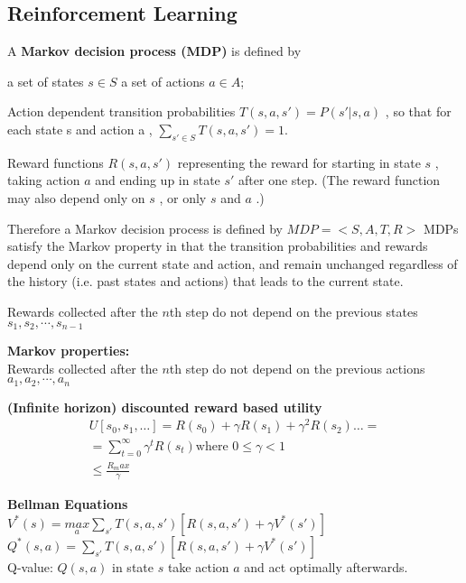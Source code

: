 \subsection{Reinforcement Learning}

A \textbf{Markov decision process (MDP)} is defined by

a set of states  $s\in S$ a set of actions $a \in A$;

Action dependent transition probabilities $T(s,a,s')=P(s'|s, a)$ , so that for each state  s  and action  a ,  $\displaystyle \sum _{s'\in S} T(s,a,s')=1$.

Reward functions $R(s, a, s')$ representing the reward for starting in state  $s$ , taking action  $a$  and ending up in state  $s'$  after one step. (The reward function may also depend only on  $s$ , or only  $s$  and  $a$ .)

Therefore a Markov decision process is defined by $MDP = <S,A,T,R>$ MDPs satisfy the Markov property in that the transition probabilities and rewards depend only on the current state and action, and remain unchanged regardless of the history (i.e. past states and actions) that leads to the current state.

Rewards collected after the  $n$th  step do not depend on the previous states $s_1,s_2,\cdots,s_{n-1}$

\textbf{Markov properties:}\\

Rewards collected after the $n$th  step do not depend on the previous actions $a_1,a_2,\cdots,a_{n}$

\textbf{(Infinite horizon) discounted reward based utility}\\

\begin{align*}
U[s_0,s_1,\ldots ]= R(s_0) + \gamma R(s_1) + \gamma ^2 R(s_2) \ldots = \\
= \sum _{t=0}^\infty \gamma ^ t R(s_ t) \text {where }0\leq \gamma <1\\
\leq \frac{R_max}{\gamma}
\end{align*}

\textbf{Bellman Equations}\\

$V^{*}(s) = \underset {a}{max}\sum _{s'}T(s,a,s')[R(s,a,s')+\gamma V^{*}(s')]$\\

$Q^{*}(s,a)=\sum _{s'}T(s,a,s')[R(s,a,s')+\gamma V^{*}(s')]$\\

Q-value: $Q(s,a)$ in state $s$ take action $a$ and act optimally afterwards. 

